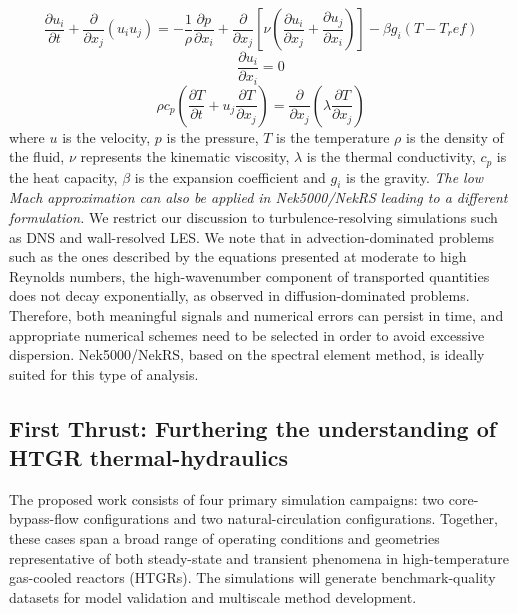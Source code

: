\begin{equation}
\frac{\partial  u_i  }{\partial t} +  \frac{\partial}{\partial x_j} \left( u_i u_j \right) =-\frac{1}{\rho} \frac{\partial p}{\partial x_i} + \frac{\partial}{\partial x_j} \left[ \nu \left( \frac{\partial u_i}{\partial x_j} +\frac{\partial u_j}{\partial x_i} \right) \right] - \beta g_i (T-T_ref)
\label{UEqn}
\end{equation}
\begin{equation}
\frac{\partial u_i}{\partial x_i} = 0
\label{rhoEqn}
\end{equation}
\begin{equation}
\rho c_p \left( \frac{\partial T }{\partial t} + u_j \frac{\partial T}{\partial x_j} \right) = \frac{\partial }{\partial x_j} \left( \lambda \frac{\partial T}{\partial x_j} \right)
\label{EEqn}
\end{equation}
where $u$ is the velocity, $p$ is the pressure, $T$ is the temperature $\rho$ is the  density of the fluid, $\nu$ represents the kinematic viscosity, $\lambda$ is the thermal conductivity, $c_p$ is the heat capacity, $\beta$ is the expansion coefficient and $g_i$ is the gravity. \textit{The low Mach approximation can also be applied in Nek5000/NekRS}  \cite{tomboulides1997numerical} \textit{leading to a different formulation.} We restrict our discussion to turbulence-resolving simulations such as DNS and wall-resolved LES. We note that in advection-dominated problems such as the ones described by the equations presented at moderate to high Reynolds numbers, the high-wavenumber component of transported quantities does not decay exponentially, as observed in diffusion-dominated problems. Therefore, both meaningful signals and numerical errors can persist in time, and appropriate numerical schemes need to be selected in order to avoid excessive dispersion. Nek5000/NekRS, based on the spectral element method, is ideally suited for this type of analysis.

\subsection*{First Thrust: Furthering the understanding of HTGR thermal-hydraulics }

The proposed work consists of four primary simulation campaigns: two core-bypass-flow configurations and two natural-circulation configurations. Together, these cases span a broad range of operating conditions and geometries representative of both steady-state and transient phenomena in high-temperature gas-cooled reactors (HTGRs). The simulations will generate benchmark-quality datasets for model validation and multiscale method development.

